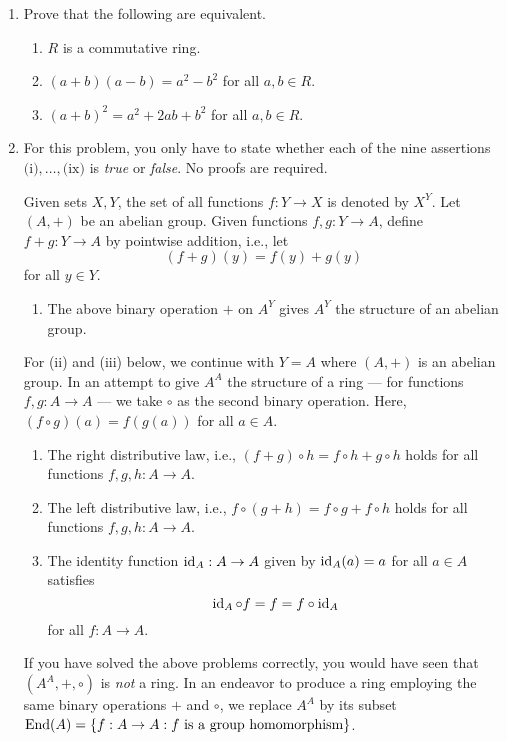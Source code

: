 \documentclass[../psets.tex]{subfiles}
\begin{document}
\begin{enumerate}[resume]
    \item Prove that the following are equivalent.
    \begin{enumerate}
        \item $R$ is a commutative ring.
        \item $(a+b)(a-b)=a^2-b^2$ for all $a,b\in R$.
        \item $(a+b)^2=a^2+2ab+b^2$ for all $a,b\in R$.
    \end{enumerate}
    \item For this problem, you only have to state whether each of the nine assertions $\text{(i)},\dots,\text{(ix)}$ is \emph{true} or \emph{false}. No proofs are required.\par
    Given sets $X,Y$, the set of all functions $f:Y\to X$ is denoted by $X^Y$. Let $(A,+)$ be an abelian group. Given functions $f,g:Y\to A$, define $f+g:Y\to A$ by pointwise addition, i.e., let
    \begin{equation*}
        (f+g)(y) = f(y)+g(y)
    \end{equation*}
    for all $y\in Y$.
    \begin{enumerate}
        \item The above binary operation $+$ on $A^Y$ gives $A^Y$ the structure of an abelian group.
    \end{enumerate}
    For (ii) and (iii) below, we continue with $Y=A$ where $(A,+)$ is an abelian group. In an attempt to give $A^A$ the structure of a ring --- for functions $f,g:A\to A$ --- we take $\circ$ as the second binary operation. Here, $(f\circ g)(a)=f(g(a))$ for all $a\in A$.
    \begin{enumerate}[resume]
        \item The right distributive law, i.e., $(f+g)\circ h=f\circ h+g\circ h$ holds for all functions $f,g,h:A\to A$.
        \item The left distributive law, i.e., $f\circ(g+h)=f\circ g+f\circ h$ holds for all functions $f,g,h:A\to A$.
        \item The identity function $\operatorname{id}_A:A\to A$ given by $\operatorname{id}_A(a)=a$ for all $a\in A$ satisfies
        \begin{equation*}
            \operatorname{id}_A\circ f = f = f\circ\operatorname{id}_A
        \end{equation*}
        for all $f:A\to A$.
    \end{enumerate}
    If you have solved the above problems correctly, you would have seen that $(A^A,+,\circ)$ is \emph{not} a ring. In an endeavor to produce a ring employing the same binary operations $+$ and $\circ$, we replace $A^A$ by its subset $\operatorname{End}(A)=\{f:A\to A:f\text{ is a group homomorphism}\}$.

\end{enumerate}
\end{document}
